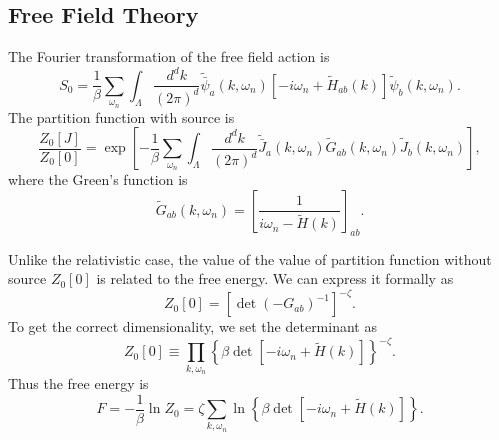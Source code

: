 \documentclass[aps,prb,superscriptaddress,nofootinbib]{revtex4}
\begin{document}
\subsection{Free Field Theory}

The Fourier transformation of the free field action is
\begin{equation}
	S_0 = \frac{1}{\beta}\sum_{\omega_n} \int_{\Lambda} \frac{d^dk}{(2\pi)^d}
	\tilde{\bar{\psi}}_a(k,\omega_n)\left[-i\omega_n + \tilde{H}_{ab}(k)\right]\tilde{\psi}_b(k,\omega_n).
\end{equation}
The partition function with source is
\begin{equation}
	\frac{Z_0[J]}{Z_0[0]} = \exp\left[-\frac{1}{\beta}\sum_{\omega_n} \int_{\Lambda} \frac{d^dk}{(2\pi)^d}\tilde{\bar J}_a(k,\omega_n) \tilde{G}_{ab}(k,\omega_n) \tilde{J}_b(k,\omega_n) \right],
\end{equation}
where the Green's function is
\begin{equation}
	\tilde{G}_{ab}(k,\omega_n) = \left[\frac{1}{i\omega_n - \tilde{H}(k)}\right]_{ab}.
\end{equation}

Unlike the relativistic case, the value of the value of partition function without source $Z_0[0]$ is related to the free energy.
We can express it formally as
\begin{equation*}
	Z_0[0]= \left[\det (-G_{ab})^{-1}\right]^{-\zeta}.
\end{equation*}
To get the correct dimensionality, we set the determinant as
\begin{equation*}
	Z_0[0] \equiv \prod_{k,\omega_n}\left\{\beta \det\left[-i\omega_n+\tilde{H}(k)\right]\right\}^{-\zeta}.
\end{equation*}
Thus the free energy is
\begin{equation}
	F = -\frac{1}{\beta} \ln Z_0
	= \zeta \sum_{k,\omega_n} \ln\left\{\beta\det\left[-i\omega_n+\tilde{H}(k)\right]\right\}.
\end{equation}
\end{document}
